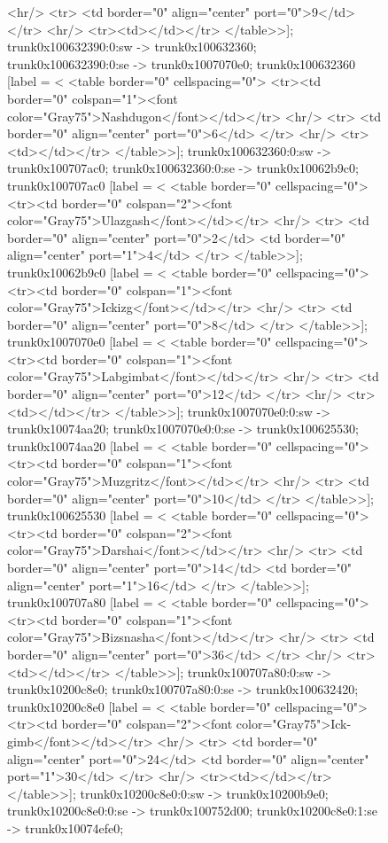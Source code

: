 \documentclass[12pt]{article}
\begin{document}
\begin{figure}
{{	<hr/>
	<tr>
	<td border="0" align="center" port="0">9</td>
	</tr>
	<hr/>
	<tr><td></td></tr>
</table>>];
	trunk0x100632390:0:sw -> trunk0x100632360;
	trunk0x100632390:0:se -> trunk0x1007070e0;
	trunk0x100632360 [label = <
<table border="0" cellspacing="0">
	<tr><td border="0" colspan="1"><font color="Gray75">Nashdugon</font></td></tr>
	<hr/>
	<tr>
	<td border="0" align="center" port="0">6</td>
	</tr>
	<hr/>
	<tr><td></td></tr>
</table>>];
	trunk0x100632360:0:sw -> trunk0x100707ac0;
	trunk0x100632360:0:se -> trunk0x10062b9c0;
	trunk0x100707ac0 [label = <
<table border="0" cellspacing="0">
	<tr><td border="0" colspan="2"><font color="Gray75">Ulazgash</font></td></tr>
	<hr/>
	<tr>
	<td border="0" align="center" port="0">2</td>
	<td border="0" align="center" port="1">4</td>
	</tr>
</table>>];
	trunk0x10062b9c0 [label = <
<table border="0" cellspacing="0">
	<tr><td border="0" colspan="1"><font color="Gray75">Ickizg</font></td></tr>
	<hr/>
	<tr>
	<td border="0" align="center" port="0">8</td>
	</tr>
</table>>];
	trunk0x1007070e0 [label = <
<table border="0" cellspacing="0">
	<tr><td border="0" colspan="1"><font color="Gray75">Labgimbat</font></td></tr>
	<hr/>
	<tr>
	<td border="0" align="center" port="0">12</td>
	</tr>
	<hr/>
	<tr><td></td></tr>
</table>>];
	trunk0x1007070e0:0:sw -> trunk0x10074aa20;
	trunk0x1007070e0:0:se -> trunk0x100625530;
	trunk0x10074aa20 [label = <
<table border="0" cellspacing="0">
	<tr><td border="0" colspan="1"><font color="Gray75">Muzgritz</font></td></tr>
	<hr/>
	<tr>
	<td border="0" align="center" port="0">10</td>
	</tr>
</table>>];
	trunk0x100625530 [label = <
<table border="0" cellspacing="0">
	<tr><td border="0" colspan="2"><font color="Gray75">Darshai</font></td></tr>
	<hr/>
	<tr>
	<td border="0" align="center" port="0">14</td>
	<td border="0" align="center" port="1">16</td>
	</tr>
</table>>];
	trunk0x100707a80 [label = <
<table border="0" cellspacing="0">
	<tr><td border="0" colspan="1"><font color="Gray75">Bizsnasha</font></td></tr>
	<hr/>
	<tr>
	<td border="0" align="center" port="0">36</td>
	</tr>
	<hr/>
	<tr><td></td></tr>
</table>>];
	trunk0x100707a80:0:sw -> trunk0x10200c8e0;
	trunk0x100707a80:0:se -> trunk0x100632420;
	trunk0x10200c8e0 [label = <
<table border="0" cellspacing="0">
	<tr><td border="0" colspan="2"><font color="Gray75">Ick-gimb</font></td></tr>
	<hr/>
	<tr>
	<td border="0" align="center" port="0">24</td>
	<td border="0" align="center" port="1">30</td>
	</tr>
	<hr/>
	<tr><td></td></tr>
</table>>];
	trunk0x10200c8e0:0:sw -> trunk0x10200b9e0;
	trunk0x10200c8e0:0:se -> trunk0x100752d00;
	trunk0x10200c8e0:1:se -> trunk0x10074efe0;
}}
\end{figure}
\end{document}
